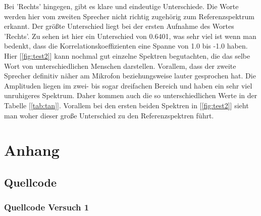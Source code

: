 \documentclass[12pt, oneside, a4paper, \docLanguage]{report}
\begin{document}
Bei 'Rechts' hingegen, gibt es klare und eindeutige Unterschiede. Die Worte werden hier vom zweiten Sprecher nicht richtig zugehörig zum Referenzspektrum erkannt.
Der größte Unterschied liegt bei der ersten Aufnahme des Wortes 'Rechts'.
Zu sehen ist hier ein Unterschied von 0.6401, was sehr viel ist wenn man bedenkt, dass die Korrelationskoeffizienten eine Spanne von 1.0 bis -1.0 haben.
\newpage
Hier [\ref{fig:test2}] kann nochmal gut einzelne Spektren begutachten, die das selbe Wort von unterschiedlichen Menschen darstellen.
Vorallem, dass der zweite Sprecher definitiv näher am Mikrofon beziehungsweise lauter gesprochen hat.
\newline
Die Amplituden liegen im zwei- bis sogar dreifachen Bereich und haben ein sehr viel unruhigeres Spektrum.
Daher kommen auch die so unterschiedlichen Werte in der Tabelle [\ref{tab:tan}].
Vorallem bei den ersten beiden Spektren in [\ref{fig:test2}]  sieht man woher dieser große Unterschied zu den Referenzspektren führt.

%
%
\renewcommand\thesection{A.\arabic{section}}
\renewcommand\thesubsection{\thesection.\arabic{subsection}}

\chapter*{Anhang}
\label{chap:APPENDIX}
\addtocounter{chapter}{1}
\setcounter{section}{0}

\section{Quellcode}
\label{chap:APPENDIX_SOURCECODE}

\subsection{Quellcode Versuch 1}
\label{chap:APPENDIX_SOURCECODE_V1}

\newpage

\newpage

\newpage

\newpage
\end{document}
